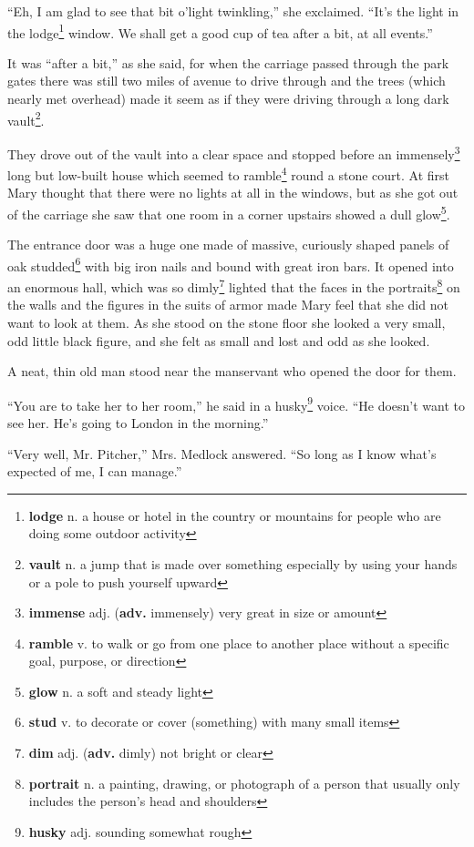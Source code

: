 ``Eh, I am glad to see that bit o'light twinkling,'' she exclaimed. ``It's the light in the lodge\footnote{\textbf{lodge} n. a house or hotel in the country or mountains for people who are doing some outdoor activity} window. We shall get a good cup of tea after a bit, at all events.''

It was ``after a bit,'' as she said, for when the carriage passed through the park gates there was still two miles of avenue to drive through and the trees (which nearly met overhead) made it seem as if they were driving through a long dark vault\footnote{\textbf{vault} n. a jump that is made over something especially by using your hands or a pole to push yourself upward}.

They drove out of the vault into a clear space and stopped before an immensely\footnote{\textbf{immense} adj. (\textbf{adv.} immensely) very great in size or amount} long but low-built house which seemed to ramble\footnote{\textbf{ramble} v. to walk or go from one place to another place without a specific goal, purpose, or direction} round a stone court. At first Mary thought that there were no lights at all in the windows, but as she got out of the carriage she saw that one room in a corner upstairs showed a dull glow\footnote{\textbf{glow} n. a soft and steady light}.

The entrance door was a huge one made of massive, curiously shaped panels of oak studded\footnote{\textbf{stud} v. to decorate or cover (something) with many small items} with big iron nails and bound with great iron bars. It opened into an enormous hall, which was so dimly\footnote{\textbf{dim} adj. (\textbf{adv.} dimly) not bright or clear} lighted that the faces in the portraits\footnote{\textbf{portrait} n. a painting, drawing, or photograph of a person that usually only includes the person's head and shoulders} on the walls and the figures in the suits of armor made Mary feel that she did not want to look at them. As she stood on the stone floor she looked a very small, odd little black figure, and she felt as small and lost and odd as she looked.

A neat, thin old man stood near the manservant who opened the door for them.

``You are to take her to her room,'' he said in a husky\footnote{\textbf{husky} adj. sounding somewhat rough} voice. ``He doesn't want to see her. He's going to London in the morning.''

``Very well, Mr. Pitcher,'' Mrs. Medlock answered. ``So long as I know what's expected of me, I can manage.''

